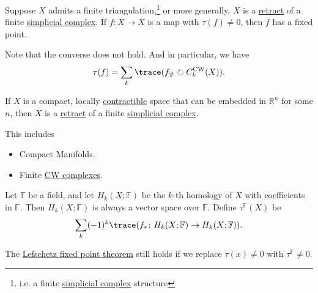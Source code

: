 \begin{theorem}\label{thm:Lefschetz-fixed-point}
	Suppose \(X\) admits a finite triangulation,\footnote{i.e. a finite \hyperref[def:simplicial-complex]{simplicial complex} structure}
	or more generally, \(X\) is a \hyperref[def:retraction]{retract} of a finite \hyperref[def:simplicial-complex]{simplicial complex}.
	If \(f \colon X \to X\) is a map with \(\tau(f) \neq 0\), then \(f\) has a fixed point.
\end{theorem}
\begin{note}
	Note that the converse does not hold. And in particular, we have
	\[
		\tau (f) = \sum\limits_{k} \trace(f_\# \circlearrowright C^{\mathrm{CW}}_k(X) ).
	\]
\end{note}
\begin{theorem}\label{thm:retract-simplicial-complex}
	If \(X\) is a compact, locally \hyperref[def:contractible]{contractible} space that can be embedded in \(\mathbb{R}^n\) for some \(n\), then \(X\) is a
	\hyperref[def:retraction]{retract} of a finite \hyperref[def:simplicial-complex]{simplicial complex}.
\end{theorem}
\begin{remark}
	This includes
	\begin{itemize}
		\item Compact Manifolds.
		\item Finite \hyperref[def:CW-Complex]{CW complexes}.
	\end{itemize}
\end{remark}
\begin{definition}\label{def:Lefschetz-number-better}
	Let \(\mathbb{F}\) be a field, and let \(H_k(X; \mathbb{F})\) be the \(k\)-th homology of \(X\) with coefficients in \(\mathbb{F}\).
	Then \(H_k(X; \mathbb{F})\) is always a vector space over \(\mathbb{F}\). Define \(\tau^{\mathbb{F}}(X)\) be
	\[
		\sum_k (-1)^k \trace(f_\ast \colon H_k(X; \mathbb{F}) \to H_k(X; \mathbb{F})).
	\]
\end{definition}
\begin{remark}
	The \hyperref[thm:Lefschetz-fixed-point]{Lefschetz fixed point theorem} still holds if we replace \(\tau(x) \neq 0\) with \(\tau^{\mathbb{F}} \neq 0\).
\end{remark}
